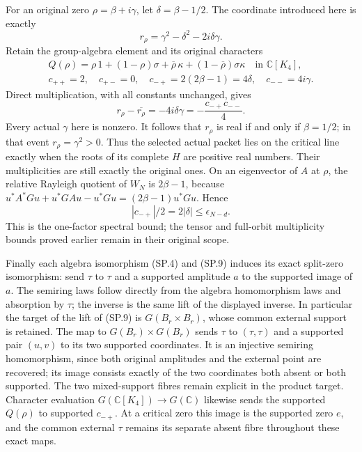 For an original zero \(\rho=\beta+i\gamma\), let
\(\delta=\beta-1/2\). The coordinate introduced here is exactly
\[
 r_\rho=\gamma^2-\delta^2-2i\delta\gamma.
 \tag{SP.28}
\]
Retain the group-algebra element and its original characters
\[
 \begin{gathered}
 Q(\rho)=\rho\,1+(1-\rho)\sigma
             +\overline\rho\,\kappa+(1-\overline\rho)\sigma\kappa
                    \quad\text{in }\mathbb C[K_4],\\
 c_{++}=2,\quad c_{+-}=0,\quad
 c_{-+}=2(2\beta-1)=4\delta,\quad c_{--}=4i\gamma.
 \end{gathered}
 \tag{SP.29}
\]
Direct multiplication, with all constants unchanged, gives
\[
 r_\rho-\overline{r_\rho}
       =-4i\delta\gamma=-\frac{c_{-+}c_{--}}4.
 \tag{SP.30}
\]
Every actual \(\gamma\) here is nonzero. It follows that
\(r_\rho\) is real if and only if \(\beta=1/2\); in that event
\(r_\rho=\gamma^2>0\). Thus the selected actual packet lies on
the critical line exactly when the roots of its complete \(H\)
are positive real numbers. Their multiplicities are still exactly
the original ones. On an eigenvector of \(A\) at \(\rho\), the
relative Rayleigh quotient of \(W_N\) is \(2\beta-1\), because
\(u^*A^*Gu+u^*GAu-u^*Gu=(2\beta-1)u^*Gu\). Hence
\[
 |c_{-+}|/2=2|\delta|\le\epsilon_{N-d}.
 \tag{SP.31}
\]
This is the one-factor spectral bound; the tensor and full-orbit
multiplicity bounds proved earlier remain in their original scope.

Finally each algebra isomorphism (SP.4) and (SP.9) induces its
exact split-zero isomorphism: send \(\tau\) to \(\tau\) and a
supported amplitude \(a\) to the supported image of \(a\).
The semiring laws follow directly from the algebra homomorphism
laws and absorption by \(\tau\); the inverse is the same lift
of the displayed inverse. In particular the target of the lift
of (SP.9) is \(G(B_r\times B_r)\), whose common external support
is retained. The map to \(G(B_r)\times G(B_r)\) sends \(\tau\)
to \((\tau,\tau)\) and a supported pair \((u,v)\) to its two
supported coordinates. It is an injective semiring homomorphism,
since both original amplitudes and the external point are recovered;
its image consists exactly of the two coordinates both absent or
both supported. The two mixed-support fibres remain explicit in
the product target. Character evaluation
\(G(\mathbb C[K_4])\to G(\mathbb C)\) likewise sends the supported
\(Q(\rho)\) to supported \(c_{-+}\). At a critical zero this image
is the supported zero \(e\), and the common external \(\tau\)
remains its separate absent fibre throughout these exact maps.

